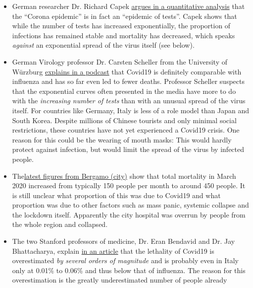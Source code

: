 \begin{itemize}
\tightlist
\item
  German researcher Dr. Richard Capek
  \href{https://coronadaten.wordpress.com/}{argues in a quantitative
  analysis} that the ``Corona epidemic'' is in fact an ``epidemic of
  tests''. Capek shows that while the number of tests has increased
  exponentially, the proportion of infections has remained stable and
  mortality has decreased, which speaks \emph{against} an exponential
  spread of the virus itself (see below).
\item
  German Virology professor Dr. Carsten Scheller from the University of
  Würzburg \href{https://www.youtube.com/watch?v=w-uub0urNfw}{explains
  in a podcast} that Covid19 is definitely comparable with influenza and
  has so far even led to fewer deaths. Professor Scheller suspects that
  the exponential curves often presented in the media have more to do
  with the \emph{increasing number of tests} than with an unusual spread
  of the virus itself. For countries like Germany, Italy is less of a
  role model than Japan and South Korea. Despite millions of Chinese
  tourists and only minimal social restrictions, these countries have
  not yet experienced a Covid19 crisis. One reason for this could be the
  wearing of mouth masks: This would hardly protect against infection,
  but would limit the spread of the virus by infected people.
\item
  The\href{https://www.ecodibergamo.it/stories/bergamo-citta/a-bergamo-decessi-4-volte-oltre-la-medialeco-lancia-unindagine-nei-comuni_1346651_11/}{latest
  figures from Bergamo (city)} show that total mortality in March 2020
  increased from typically 150 people per month to around 450 people. It
  is still unclear what proportion of this was due to Covid19 and what
  proportion was due to other factors such as mass panic, systemic
  collapse and the lockdown itself. Apparently the city hospital was
  overrun by people from the whole region and collapsed.
\item
  The two Stanford professors of medicine, Dr. Eran Bendavid and Dr. Jay
  Bhattacharya, explain
  \href{https://web.archive.org/web/20200325103650/https://www.wsj.com/articles/is-the-coronavirus-as-deadly-as-they-say-11585088464}{in
  an article} that the lethality of Covid19 is overestimated \emph{by
  several orders of magnitude} and is probably even in Italy only at
  0.01\% to 0.06\% and thus below that of influenza. The reason for this
  overestimation is the greatly underestimated number of people already

\end{itemize}
